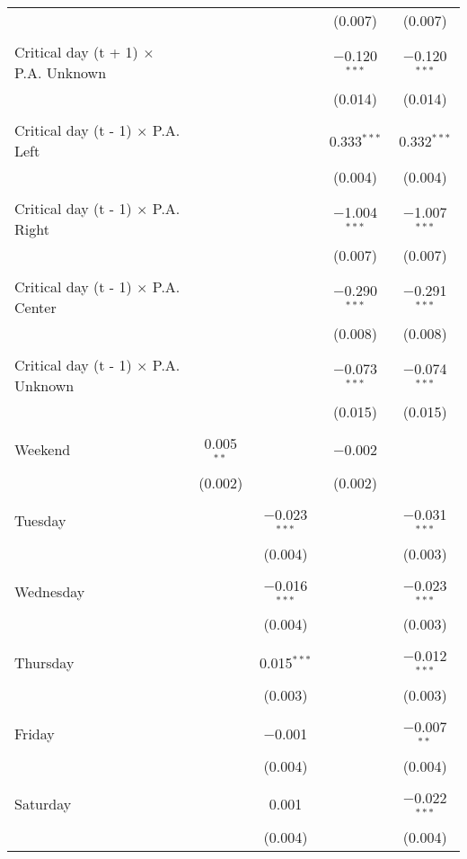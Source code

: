 \documentclass[
]{article}
\begin{document}
\begin{table}[!htbp]
{\begin{tabular}{@{\extracolsep{5pt}}lcccc}
  &  &  & (0.007) & (0.007) \\ 
  & & & & \\ 
 Critical day (t + 1) $\times$ P.A. Unknown &  &  & $-$0.120$^{***}$ & $-$0.120$^{***}$ \\ 
  &  &  & (0.014) & (0.014) \\ 
  & & & & \\ 
 Critical day (t - 1) $\times$ P.A. Left &  &  & 0.333$^{***}$ & 0.332$^{***}$ \\ 
  &  &  & (0.004) & (0.004) \\ 
  & & & & \\ 
 Critical day (t - 1) $\times$ P.A. Right &  &  & $-$1.004$^{***}$ & $-$1.007$^{***}$ \\ 
  &  &  & (0.007) & (0.007) \\ 
  & & & & \\ 
 Critical day (t - 1) $\times$ P.A. Center &  &  & $-$0.290$^{***}$ & $-$0.291$^{***}$ \\ 
  &  &  & (0.008) & (0.008) \\ 
  & & & & \\ 
 Critical day (t - 1) $\times$ P.A. Unknown &  &  & $-$0.073$^{***}$ & $-$0.074$^{***}$ \\ 
  &  &  & (0.015) & (0.015) \\ 
  & & & & \\ 
 Weekend & 0.005$^{**}$ &  & $-$0.002 &  \\ 
  & (0.002) &  & (0.002) &  \\ 
  & & & & \\ 
 Tuesday &  & $-$0.023$^{***}$ &  & $-$0.031$^{***}$ \\ 
  &  & (0.004) &  & (0.003) \\ 
  & & & & \\ 
 Wednesday &  & $-$0.016$^{***}$ &  & $-$0.023$^{***}$ \\ 
  &  & (0.004) &  & (0.003) \\ 
  & & & & \\ 
 Thursday &  & 0.015$^{***}$ &  & $-$0.012$^{***}$ \\ 
  &  & (0.003) &  & (0.003) \\ 
  & & & & \\ 
 Friday &  & $-$0.001 &  & $-$0.007$^{**}$ \\ 
  &  & (0.004) &  & (0.004) \\ 
  & & & & \\ 
 Saturday &  & 0.001 &  & $-$0.022$^{***}$ \\ 
  &  & (0.004) &  & (0.004) \\ 

\end{tabular}}
\end{table}
\end{document}
